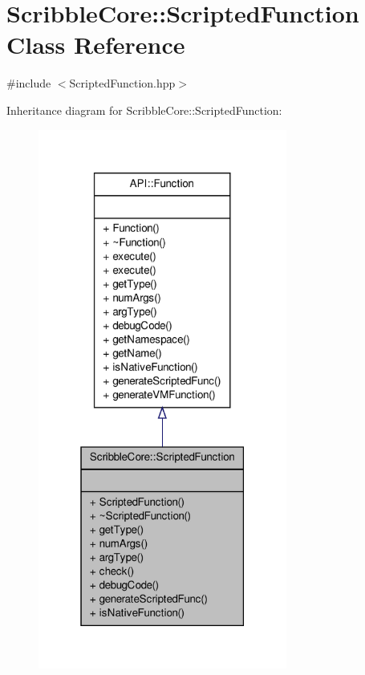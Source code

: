 \hypertarget{class_scribble_core_1_1_scripted_function}{\section{Scribble\-Core\-:\-:Scripted\-Function Class Reference}
\label{class_scribble_core_1_1_scripted_function}
}


{\ttfamily \#include $<$Scripted\-Function.\-hpp$>$}



Inheritance diagram for Scribble\-Core\-:\-:Scripted\-Function\-:
\nopagebreak
\begin{figure}[H]
\begin{center}
\leavevmode
\includegraphics[width=232pt]{class_scribble_core_1_1_scripted_function__inherit__graph}
\end{center}
\end{figure}


